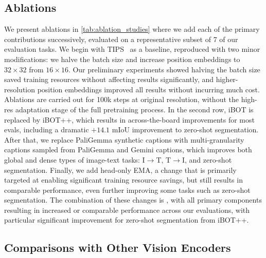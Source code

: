 \subsection{Ablations}
We present ablations in \cref{tab:ablation_studies} where we add each of the primary contributions successively, evaluated on a representative subset of 7 of our evaluation tasks.
We begin with TIPS~\citep{tips_paper} as a baseline, reproduced with two minor modifications: we halve the batch size and increase position embeddings to $32\times32$ from $16\times16$.
Our preliminary experiments showed halving the batch size saved training resources without affecting results significantly, and higher-resolution position embeddings improved all results without incurring much cost. 
Ablations are carried out for 100k steps at original resolution, without the high-res adaptation stage of the full pretraining process.
In the second row, iBOT is replaced by iBOT++, which results in across-the-board improvements for most evals, including a dramatic $+14.1$ mIoU improvement to zero-shot segmentation.
After that, we replace PaliGemma synthetic captions with multi-granularity captions sampled from PaliGemma and Gemini captions, which improves both global and dense types of image-text tasks: I$\rightarrow$T, T$\rightarrow$I, and zero-shot segmentation.
Finally, we add head-only EMA, a change that is primarily targeted at enabling significant training resource savings, but still results in comparable performance, even further improving some tasks such as  zero-shot segmentation. 
The combination of these changes is \tipsvtwo, with all primary components resulting in increased or comparable performance across our evaluations, with particular significant improvement for zero-shot segmentation from iBOT++. 



 



\subsection{Comparisons with Other Vision Encoders}

